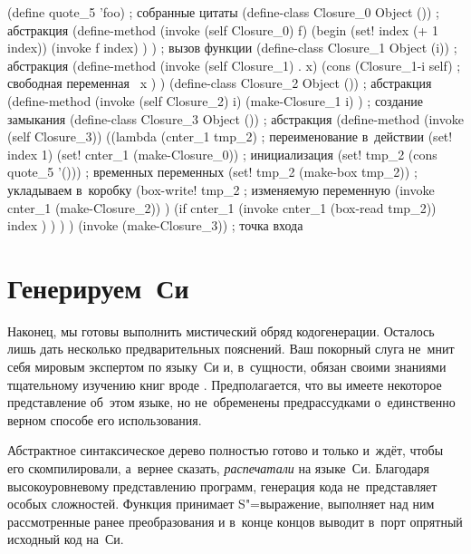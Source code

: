 \begin{code:lisp}
(define quote_5 'foo)                    ; собранные цитаты
(define-class Closure_0 Object ())       ; абстракция 
(define-method (invoke (self Closure_0) f)
  (begin
    (set! index (+ 1 index))
    (invoke f index) ) )                 ; вызов функции
(define-class Closure_1 Object (i))      ; абстракция 
(define-method (invoke (self Closure_1) . x)
  (cons (Closure_1-i self)               ; свободная переменная~
        x ) )
(define-class Closure_2 Object ())       ; абстракция 
(define-method (invoke (self Closure_2) i)
  (make-Closure_1 i) )                   ; создание замыкания
(define-class Closure_3 Object ())       ; абстракция 
(define-method (invoke (self Closure_3))
  ((lambda (cnter_1 tmp_2)               ; переименование в~действии
     (set! index 1)
     (set! cnter_1 (make-Closure_0))     ; инициализация
     (set! tmp_2 (cons quote_5 '()))     ; \quad временных переменных
     (set! tmp_2 (make-box tmp_2))       ; укладываем в~коробку
     (box-write! tmp_2                   ; \quad изменяемую переменную
                 (invoke cnter_1 (make-Closure_2)) )
     (if cnter_1
         (invoke cnter_1 (box-read tmp_2))
         index ) ) ) )
(invoke (make-Closure_3))                ; точка входа
\end{code:lisp}


\section{Генерируем~Си}\label{cc/sect:gen}

Наконец, мы готовы выполнить мистический обряд кодогенерации. Осталось лишь
дать несколько предварительных пояснений. Ваш покорный слуга не~мнит себя
мировым экспертом по языку~Си и, в~сущности, обязан своими знаниями тщательному
изучению книг вроде \cite{iso90,hs91,cek+89}. Предполагается, что вы имеете
некоторое представление об~этом языке, но не~обременены предрассудками
о~единственно верном способе его использования.

Абстрактное синтаксическое дерево полностью готово и только и~ждёт, чтобы его
скомпилировали, а~вернее сказать, \emph{распечатали} на языке~Си. Благодаря
высокоуровневому представлению программ, генерация кода не~представляет особых
сложностей. Функция  принимает S"=выражение, выполняет над ним
рассмотренные ранее преобразования и в~конце концов выводит в~порт 
опрятный исходный код на~Си.

